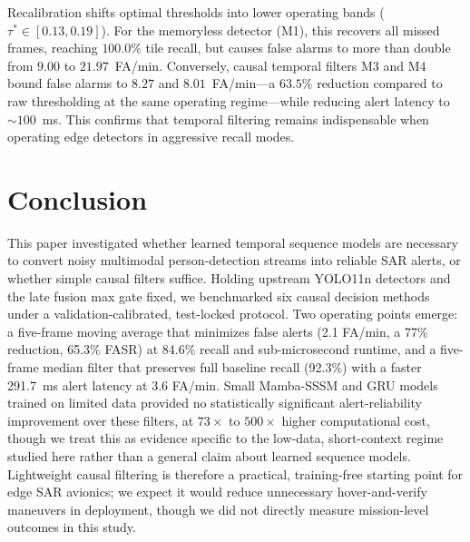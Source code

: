 \documentclass[conference]{IEEEtran}
\begin{document}
\begin{table}[!t]
\centering
\caption{Recall-Weighted ($F_2$, $P \ge 0.95$) vs.\ Baseline $F_1$ Operating Points}
\label{tab:f2_sensitivity}
\end{table}

Recalibration shifts optimal thresholds into lower operating bands ($\tau^* \in [0.13, 0.19]$). For the memoryless detector (M1), this recovers all missed frames, reaching $100.0\%$ tile recall, but causes false alarms to more than double from $9.00$ to $21.97$~FA/min. Conversely, causal temporal filters M3 and M4 bound false alarms to $8.27$ and $8.01$~FA/min---a $63.5\%$ reduction compared to raw thresholding at the same operating regime---while reducing alert latency to $\sim 100$~ms. This confirms that temporal filtering remains indispensable when operating edge detectors in aggressive recall modes.

\balance

\section{Conclusion}
This paper investigated whether learned temporal sequence models are necessary to convert noisy multimodal person-detection streams into reliable SAR alerts, or whether simple causal filters suffice. Holding upstream YOLO11n detectors and the late fusion max gate fixed, we benchmarked six causal decision methods under a validation-calibrated, test-locked protocol. Two operating points emerge: a five-frame moving average that minimizes false alerts (2.1 FA/min, a 77\% reduction, 65.3\% FASR) at 84.6\% recall and sub-microsecond runtime, and a five-frame median filter that preserves full baseline recall (92.3\%) with a faster 291.7~ms alert latency at 3.6 FA/min. Small Mamba-SSSM and GRU models trained on limited data provided no statistically significant alert-reliability improvement over these filters, at $73\times$ to $500\times$ higher computational cost, though we treat this as evidence specific to the low-data, short-context regime studied here rather than a general claim about learned sequence models. Lightweight causal filtering is therefore a practical, training-free starting point for edge SAR avionics; we expect it would reduce unnecessary hover-and-verify maneuvers in deployment, though we did not directly measure mission-level outcomes in this study.
\end{document}
